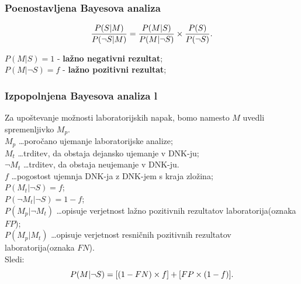 \documentclass{beamer}
\begin{document}
\begin{frame}
    \frametitle{Poenostavljena Bayesova analiza}
    \[
        \frac{P(S \lvert M)}{P(\neg S \lvert M)} = \frac{P(M \lvert S)}{P(M \lvert \neg S)} \times \frac{P(S)}{P(\neg S)}. \vspace{3mm}
    \] 
    \begin{block}{}
        \centering
        $P(M \lvert S) = 1$ - \textbf{lažno negativni rezultat};\\ \vspace{2mm}
        $P(M \lvert \neg S) = f$ - \textbf{lažno pozitivni rezultat}; 
    \end{block}
\end{frame}

\begin{frame}
    \frametitle{Izpopolnjena Bayesova analiza l}
    Za upoštevanje možnosti laboratorijskih napak, bomo namesto $M$ uvedli spremenljivko $M_p$.\\ \vspace{3mm}
    $M_p$ \dots poročano ujemanje laboratorijske analize; \\ 
    $M_t$ \dots trditev, da obstaja dejansko ujemanje v DNK-ju;\\
    $\neg M_t$ \dots trditev, da obstaja neujemanje v DNK-ju.  \\ 
    $f$ \dots pogostost ujemnja DNK-ja z DNK-jem s kraja zložina;\\
    $P(M_t \lvert \neg S) = f$; \\
    $P(\neg M_t \lvert \neg S) = 1-f$;\\
    $P(M_p \lvert \neg M_t)$ \dots opisuje verjetnost lažno pozitivnih rezultatov laboratorija(oznaka $FP$);\\
    $P(M_p \lvert M_t)$ \dots opisuje verjetnost resničnih pozitivnih rezultatov laboratorija(oznaka $FN$).\\\vspace{3mm}
    Sledi:
    \[
        P(M \lvert \neg S) = [(1 - FN) \times f] + [FP \times (1 - f)]. \vspace{2mm}
    \]
\end{frame}
 
\end{document}
